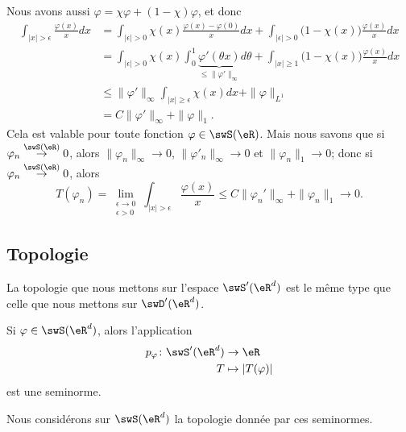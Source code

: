 \begin{example}
	Nous avons aussi \( \varphi=\chi\varphi+(1-\chi)\varphi\), et donc
	\begin{subequations}
		\begin{align}
			\int_{| x |>\epsilon}\frac{ \varphi(x) }{ x }dx & =\int_{| \epsilon |>0}\chi(x)\frac{ \varphi(x)-\varphi(0) }{ x }dx+\int_{| \epsilon |>0}\big( 1-\chi(x) \big)\frac{ \varphi(x) }{ x }dx                                      \\
			                                                & =\int_{| \epsilon |>0}\chi(x)\int_0^1\underbrace{\varphi'(\theta x)}_{\leq \| \varphi' \|_{\infty}}d\theta+\int_{| x |\geq 1}\big( 1-\chi(x) \big)\frac{ \varphi(x) }{ x }dx \\
			                                                & \leq\| \varphi' \|_{\infty}\int_{| x |\geq \epsilon}\chi(x)dx+\| \varphi \|_{L^1}                                                                                            \\
			                                                & =C\| \varphi' \|_{\infty}+\| \varphi \|_{1}.
		\end{align}
	\end{subequations}
	Cela est valable pour toute fonction \( \varphi\in\swS(\eR)\). Mais nous savons que si \( \varphi_n\stackrel{\swS(\eR)}{\to}0\), alors \( \| \varphi_n \|_{\infty}\to 0\), \( \| \varphi'_n \|_{\infty}\to 0\) et \( \| \varphi_n \|_1\to 0\); donc si \( \varphi_n\stackrel{\swS(\eR)}{\to}0\), alors
	\begin{equation}
		T(\varphi_n)=\lim_{\substack{\epsilon\to 0\\\epsilon>0}}\int_{| x |>\epsilon}\frac{ \varphi(x) }{ x }\leq C\| \varphi_n' \|_{\infty}+\| \varphi_n \|_1\to 0.
	\end{equation}
\end{example}

\subsection{Topologie}

La topologie que nous mettons sur l'espace \( \swS'(\eR^d)\) est le même type que celle que nous mettons sur \( \swD'(\eR^d)\).

\begin{propositionDef}		\label{DEFooNLIKooYfafLw}
	Si \( \varphi\in \swS(\eR^d)\), alors l'application
	\begin{equation}
		\begin{aligned}
			p_{\varphi}\colon \swS'(\eR^d) & \to \eR                \\
			T                              & \mapsto | T(\varphi) |
		\end{aligned}
	\end{equation}
	est une seminorme.

	Nous considérons sur \( \swS(\eR^d)\) la topologie donnée par ces seminormes.
\end{propositionDef}

